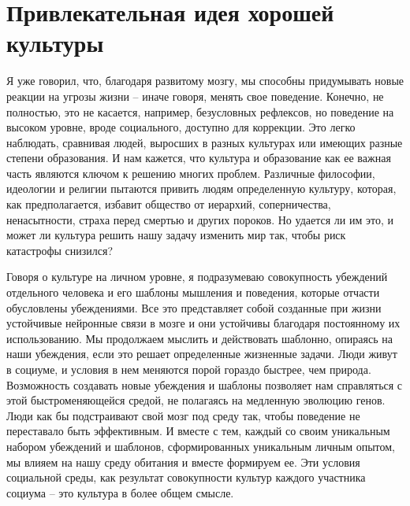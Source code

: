 \documentclass[12pt,a4paper]{report}
\begin{document}
\section*{Привлекательная идея хорошей культуры}

Я уже говорил, что, благодаря развитому мозгу, мы способны придумывать новые реакции на угрозы жизни -- иначе говоря, менять свое поведение. Конечно, не полностью, это не касается, например, безусловных рефлексов, но поведение на высоком уровне, вроде социального, доступно для коррекции. Это легко наблюдать, сравнивая людей, выросших в разных культурах или имеющих разные степени образования. И нам кажется, что культура и образование как ее важная часть являются ключом к решению многих проблем. Различные философии, идеологии и религии пытаются привить людям определенную культуру, которая, как предполагается, избавит общество от иерархий, соперничества, ненасытности, страха перед смертью и других пороков. Но удается ли им это, и может ли культура решить нашу задачу изменить мир так, чтобы риск катастрофы снизился?

\noindent Говоря о культуре на личном уровне, я подразумеваю совокупность убеждений отдельного человека и его шаблоны мышления и поведения, которые отчасти обусловлены убеждениями. Все это представляет собой созданные при жизни устойчивые нейронные связи в мозге и они устойчивы благодаря постоянному их использованию. Мы продолжаем мыслить и действовать шаблонно, опираясь на наши убеждения, если это решает определенные жизненные задачи. Люди живут в социуме, и условия в нем меняются порой гораздо быстрее, чем природа. Возможность создавать новые убеждения и шаблоны позволяет нам справляться с этой быстроменяющейся средой, не полагаясь на медленную эволюцию генов. Люди как бы подстраивают свой мозг под среду так, чтобы поведение не переставало быть эффективным. И вместе с тем, каждый со своим уникальным набором убеждений и шаблонов, сформированных уникальным личным опытом, мы влияем на нашу среду обитания и вместе формируем ее. Эти условия социальной среды, как результат совокупности культур каждого участника социума -- это культура в более общем смысле.
\end{document}
